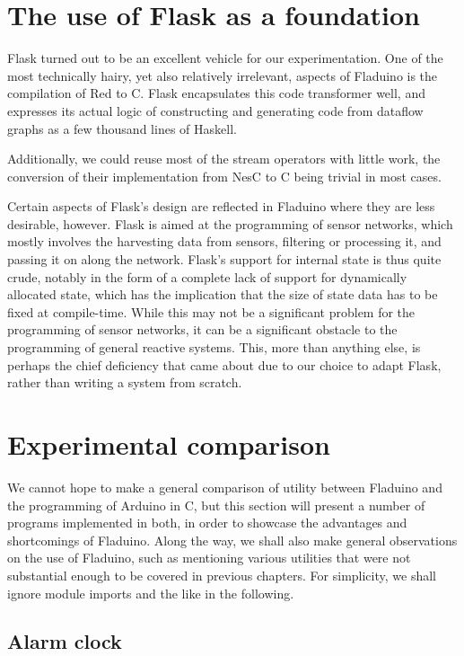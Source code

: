 \documentclass[a4paper, oneside, final]{memoir}
\begin{document}
\section{The use of Flask as a foundation}

Flask turned out to be an excellent vehicle for our experimentation.
One of the most technically hairy, yet also relatively irrelevant,
aspects of Fladuino is the compilation of Red to C.  Flask
encapsulates this code transformer well, and expresses its actual
logic of constructing and generating code from dataflow graphs as a
few thousand lines of Haskell.

Additionally, we could reuse most of the stream operators with little
work, the conversion of their implementation from NesC to C being
trivial in most cases.

Certain aspects of Flask's design are reflected in Fladuino where they
are less desirable, however.  Flask is aimed at the programming of
sensor networks, which mostly involves the harvesting data from
sensors, filtering or processing it, and passing it on along the
network.  Flask's support for internal state is thus quite crude,
notably in the form of a complete lack of support for dynamically
allocated state, which has the implication that the size of state data
has to be fixed at compile-time.  While this may not be a significant
problem for the programming of sensor networks, it can be a
significant obstacle to the programming of general reactive systems.
This, more than anything else, is perhaps the chief deficiency that
came about due to our choice to adapt Flask, rather than writing a
system from scratch.

\section{Experimental comparison}

We cannot hope to make a general comparison of utility between
Fladuino and the programming of Arduino in C, but this section will
present a number of programs implemented in both, in order to showcase
the advantages and shortcomings of Fladuino.  Along the way, we shall
also make general observations on the use of Fladuino, such as
mentioning various utilities that were not substantial enough to be
covered in previous chapters.  For simplicity, we shall ignore module
imports and the like in the following.

\subsection{Alarm clock}
\end{document}
